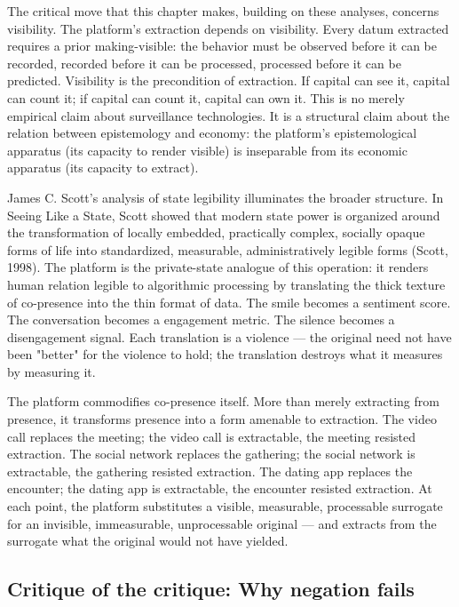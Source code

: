 The critical move that this chapter makes, building on these analyses, concerns visibility. The platform's extraction depends on visibility. Every datum extracted requires a prior making-visible: the behavior must be observed before it can be recorded, recorded before it can be processed, processed before it can be predicted. Visibility is the precondition of extraction. If capital can see it, capital can count it; if capital can count it, capital can own it. This is no merely empirical claim about surveillance technologies. It is a structural claim about the relation between epistemology and economy: the platform's epistemological apparatus (its capacity to render visible) is inseparable from its economic apparatus (its capacity to extract).

James C. Scott's analysis of state legibility illuminates the broader structure. In Seeing Like a State, Scott showed that modern state power is organized around the transformation of locally embedded, practically complex, socially opaque forms of life into standardized, measurable, administratively legible forms (Scott, 1998). The platform is the private-state analogue of this operation: it renders human relation legible to algorithmic processing by translating the thick texture of co-presence into the thin format of data. The smile becomes a sentiment score. The conversation becomes a engagement metric. The silence becomes a disengagement signal. Each translation is a violence — the original need not have been "better" for the violence to hold; the translation destroys what it measures by measuring it.

The platform commodifies co-presence itself. More than merely extracting from presence, it transforms presence into a form amenable to extraction. The video call replaces the meeting; the video call is extractable, the meeting resisted extraction. The social network replaces the gathering; the social network is extractable, the gathering resisted extraction. The dating app replaces the encounter; the dating app is extractable, the encounter resisted extraction. At each point, the platform substitutes a visible, measurable, processable surrogate for an invisible, immeasurable, unprocessable original — and extracts from the surrogate what the original would not have yielded.

\subsection{Critique of the critique: Why negation fails}

